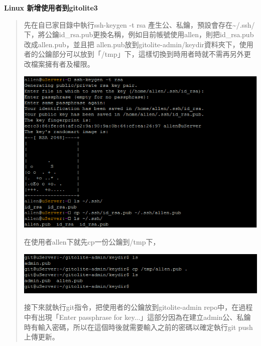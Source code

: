 \documentclass[letterpaper,10pt,english]{sphinxmanual}
\begin{document}
\textbf{Linux 新增使用者到gitolite3}
\begin{quote}

先在自已家目錄中執行ssh-keygen -t rsa 產生公、私鑰，預設會存在\textasciitilde{}/.ssh/下，將公鑰id\_rsa.pub更換名稱，例如目前帳號使用allen，則把id\_rsa.pub改成allen.pub，並且把 allen.pub放到gitolite-admin/keydir資料夾下，使用者的公鑰部分可以放到「/tmp」下，這樣切換到時用者時就不需再另外更改檔案擁有者及權限。

\includegraphics{gitolite3-adduser-1.png}

在使用者allen下就先cp一份公鑰到/tmp下，

\includegraphics{gitolite3-adduser-2.png}

接下來就執行git指令，把使用者的公鑰放到gitolite-admin repo中，在過程中有出現「Enter passphrase for key...」這部分因為在建立admin公、私鑰時有輸入密碼，所以在這個時後就需要輸入之前的密碼以確定執行git push上傳更新。


\end{quote}
\end{document}
